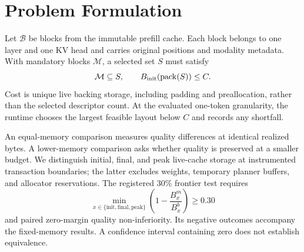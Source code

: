 \section{Problem Formulation}
\label{sec:problem}
Let $\mathcal B$ be blocks from the immutable prefill cache. Each block belongs
to one layer and one KV head and carries original positions and modality
metadata. With mandatory blocks $\mathcal M$, a selected set $S$ must satisfy
\begin{equation}
 \mathcal M\subseteq S,\qquad B_{\rm init}(\operatorname{pack}(S))\le C.
 \label{eq:budget}
\end{equation}
Cost is unique live backing storage, including padding and preallocation,
rather than the selected descriptor count. At the evaluated one-token
granularity, the runtime chooses the largest feasible layout below $C$ and
records any shortfall.

An equal-memory comparison measures quality differences at identical realized
bytes. A lower-memory comparison asks whether quality is preserved at a smaller
budget. We distinguish initial, final, and peak live-cache storage at
instrumented transaction boundaries; the latter excludes weights, temporary
planner buffers, and allocator reservations. The registered 30\% frontier test
requires
\begin{equation}
 \min_{x\in\{\mathrm{init,final,peak}\}}
 \left(1-\frac{B^m_x}{B^b_x}\right)\ge0.30
 \label{eq:isoquality}
\end{equation}
and paired zero-margin quality non-inferiority. Its negative outcomes accompany
the fixed-memory results. A confidence interval containing zero does not
establish equivalence.
